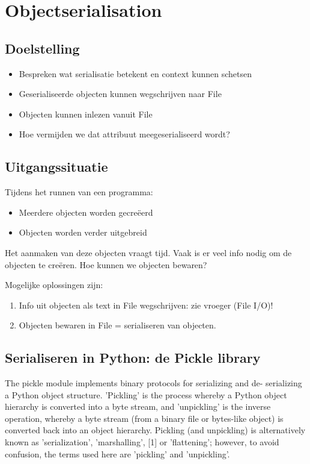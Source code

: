 \documentclass{article}
\begin{document}
\section{Objectserialisation}

\subsection{Doelstelling}

\begin{itemize}
    \item Bespreken wat serialisatie betekent en context kunnen schetsen
    \item Geserialiseerde objecten kunnen wegschrijven naar File
    \item Objecten kunnen inlezen vanuit File
    \item Hoe vermijden we dat attribuut meegeserialiseerd wordt?
\end{itemize}

\subsection{Uitgangssituatie}

Tijdens het runnen van een programma:

\begin{itemize}
    \item Meerdere objecten worden gecreëerd
    \item Objecten worden verder uitgebreid
\end{itemize}

Het aanmaken van deze objecten vraagt tijd. Vaak is er veel info nodig
om de objecten te creëren. Hoe kunnen we objecten bewaren?

Mogelijke oplossingen zijn:

\begin{enumerate}
    \item Info uit objecten als text in File wegschrijven: zie vroeger (File I/O)!
    \item Objecten bewaren in File = serialiseren van objecten.
\end{enumerate}

\subsection{Serialiseren in Python: de Pickle library}

The pickle module implements binary protocols for serializing and de-
serializing a Python object structure. 'Pickling' is the process whereby
a Python object hierarchy is converted into a byte stream, and
'unpickling' is the inverse operation, whereby a byte stream (from a
binary file or bytes-like object) is converted back into an object
hierarchy. Pickling (and unpickling) is alternatively known as
'serialization', 'marshalling', [1] or 'flattening'; however, to avoid
confusion, the terms used here are 'pickling' and 'unpickling'.
\end{document}
